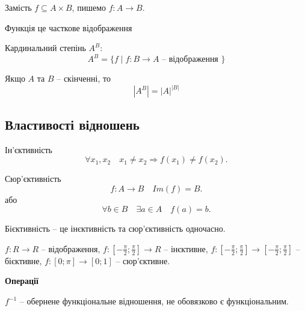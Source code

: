 Замість $f \subseteq A \times B$, пишемо $f: A \rightarrow B$.

\begin{definition}[Функція]
    Функція це часткове відображення
\end{definition}

\begin{definition}
    Кардинальний степінь $A^B$:
    $$A^B = \{ f \mid f: B \rightarrow A \text{ -- відображення } \}$$
\end{definition}

\begin{theorem}
    Якщо $A$ та $B$ -- скінченні, то
    $$|A^B| = |A|^{|B|}$$
\end{theorem}

\subsection{Властивості відношень}

\begin{definition}[Ін'єктивність]
    Ін'єктивність
    $$\forall x_1, x_2 \quad x_1 \neq x_2 \Rightarrow f(x_1) \neq f(x_2).$$
\end{definition}

\begin{definition}
    Сюр'єктивність
    $$f: A \rightarrow B \quad Im(f) = B.$$
    або
    $$\forall b \in B \quad \exists a \in A \quad f(a) = b.$$
\end{definition}

\begin{definition}[Бієктивність]
    Бієктивність -- це інєктивність та сюр'єктив\-ність одночасно.
\end{definition}

\begin{example}
    $f: R \rightarrow R$ -- відображення,
    $f: [-\frac{\pi}{2}; \frac{\pi}{2}] \rightarrow R$ -- інєктивне,
    $f: [-\frac{\pi}{2}; \frac{\pi}{2}] \rightarrow [-\frac{\pi}{2}; \frac{\pi}{2}]$ -- бієктивне,
    $f: [0; \pi] \rightarrow [0; 1]$ -- сюр'єктивне.
\end{example}

\textbf{Операції}

\begin{definition}
    $f^{-1}$ -- обернене функціональне відношення, не обовязково є функціональним.
\end{definition}

